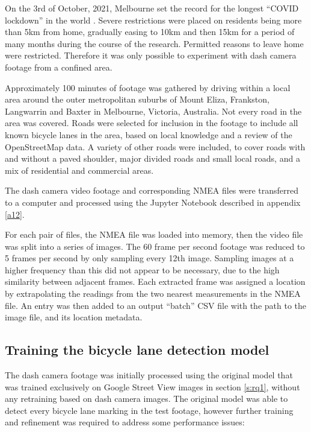 \documentclass[11pt,twoside]{report}
\begin{document}
On the 3rd of October, 2021, Melbourne set the record for the longest ``COVID lockdown'' in the world \cite{lockdown_record}.  Severe restrictions were placed on residents being more than 5km from home, gradually easing to 10km and then 15km for a period of many months during the course of the research\cite{lockdown_5km}.  Permitted reasons to leave home were restricted.  Therefore it was only possible to experiment with dash camera footage from a confined area.

Approximately 100 minutes of footage was gathered by driving within a local area around the outer metropolitan suburbs of Mount Eliza, Frankston, Langwarrin and Baxter in Melbourne, Victoria, Australia.  Not every road in the area was covered.  Roads were selected for inclusion in the footage to include all known bicycle lanes in the area, based on local knowledge and a review of the OpenStreetMap data.  A variety of other roads were included, to cover roads with and without a paved shoulder, major divided roads and small local roads, and a mix of residential and commercial areas.

The dash camera video footage and corresponding NMEA files were transferred to a computer and processed using the Jupyter Notebook described in appendix \ref{a12}.

For each pair of files, the NMEA file was loaded into memory, then the video file was split into a series of images.  The 60 frame per second footage was reduced to 5 frames per second by only sampling every 12th image.  Sampling images at a higher frequency than this did not appear to be necessary, due to the high similarity between adjacent frames.  Each extracted frame was assigned a location by extrapolating the readings from the two nearest measurements in the NMEA file.  An entry was then added to an output ``batch'' CSV file with the path to the image file, and its location metadata.


\subsection{Training the bicycle lane detection model}
\label{rq3c}

The dash camera footage was initially processed using the original model that was trained exclusively on Google Street View images in section \ref{s:rq1}, without any retraining based on dash camera images.  The original model was able to detect every bicycle lane marking in the test footage, however further training and refinement was required to address some performance issues:
\end{document}
